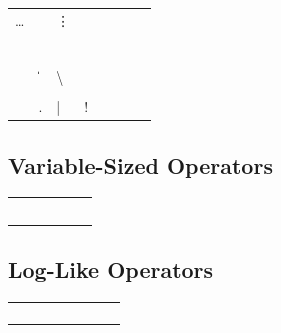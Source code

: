 	\begin{tabular}{*8l}
	\X\ldots        &\X\cdots       &\X\vdots       &\X\ddots       \\
	\X\aleph        &\X\prime       &\X\forall      &\X\infty       \\
	\X\hbar         &\X\emptyset    &\X\exists      &\X\Box         \\
	\X\imath        &\X\nabla       &\X\neg         &\X\Diamond     \\
	\X\jmath        &\X\surd        &\X\flat        &\X\triangle    \\
	\X\ell          &\X\top         &\X\natural     &\X\clubsuit    \\
	\X\wp           &\X\bot         &\X\sharp       &\X\diamondsuit \\
	\X\Re           &\X\|           &\X\backslash   &\X\heartsuit   \\
	\X\Im           &\X\angle       &\X\partial     &\X\spadesuit   \\
	\X\mho          &\X.            &\X|            &\X!
	\end{tabular}

	\subsection{Variable-Sized Operators \showfamily}

	\begin{tabular}{*6l}
	\X\sum          &\X\bigcap      &\X\bigodot     \\
	\X\prod         &\X\bigcup      &\X\bigotimes   \\
	\X\coprod       &\X\bigsqcup    &\X\bigoplus    \\
	\X\int          &\X\bigvee      &\X\biguplus    \\
	\X\oint         &\X\bigwedge
	\end{tabular}

	\subsection{Log-Like Operators \showfamily}

	\begin{tabular}{*8l}
	\Z\arccos &\Z\cos  &\Z\csc &\Z\exp &
	           \Z\ker    &\Z\limsup &\Z\min &\Z\sinh \\
	\Z\arcsin &\Z\cosh &\Z\deg &\Z\gcd &
	           \Z\lg     &\Z\ln     &\Z\Pr  &\Z\sup  \\
	\Z\arctan &\Z\cot  &\Z\det &\Z\hom &
	           \Z\lim    &\Z\log    &\Z\sec &\Z\tan  \\
	\Z\arg    &\Z\coth &\Z\dim &\Z\inf &
	           \Z\liminf &\Z\max    &\Z\sin &\Z\tanh
	\end{tabular}

